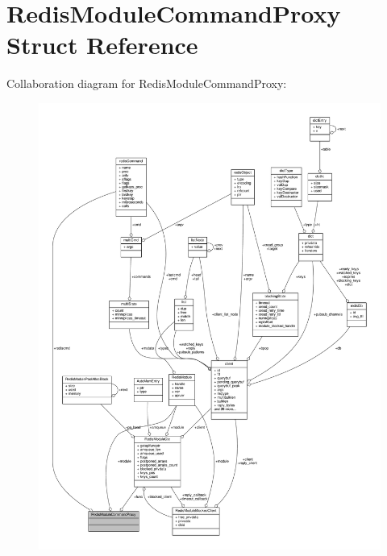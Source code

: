 \hypertarget{structRedisModuleCommandProxy}{}\section{Redis\+Module\+Command\+Proxy Struct Reference}
\label{structRedisModuleCommandProxy}


Collaboration diagram for Redis\+Module\+Command\+Proxy\+:\nopagebreak
\begin{figure}[H]
\begin{center}
\leavevmode
\includegraphics[width=350pt]{structRedisModuleCommandProxy__coll__graph}
\end{center}
\end{figure}
